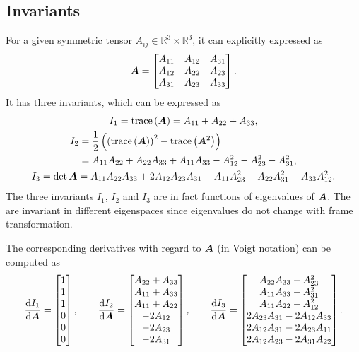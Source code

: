 \subsection{Invariants}
For a given symmetric tensor $A_{ij}\in\mathbb{R}^3\times\mathbb{R}^3$, it can explicitly expressed as
\begin{gather}
\bm{A}=
\begin{bmatrix}
A_{11}&A_{12}&A_{31}\\
A_{12}&A_{22}&A_{23}\\
A_{31}&A_{23}&A_{33}
\end{bmatrix}.
\end{gather}
It has three invariants, which can be expressed as
\begin{gather}\label{eq:tensor_invariant}
I_1=\text{trace}\left(\bm{A}\right)=A_{11}+A_{22}+A_{33},\\
\begin{split}
I_2&=\dfrac{1}{2}\left(\left(\text{trace}\left(\bm{A}\right)\right)^2-\text{trace}\left(\bm{A}^2\right)\right)\\
&=A_{11}A_{22}+A_{22}A_{33}+A_{11}A_{33}-A_{12}^2-A_{23}^2-A_{31}^2,
\end{split}\\
I_3=\det{\bm{A}}=A_{11}A_{22}A_{33}+2A_{12}A_{23}A_{31}-A_{11}A_{23}^2-A_{22}A_{31}^2-A_{33}A_{12}^2.
\end{gather}
The three invariants $I_1$, $I_2$ and $I_3$ are in fact functions of eigenvalues of $\bm{A}$.
The are invariant in different eigenspaces since eigenvalues do not change with frame transformation.

The corresponding derivatives with regard to $\bm{A}$ (in Voigt notation) can be computed as
\begin{gather}
	\dfrac{\mathrm{d}I_1}{\mathrm{d}\bm{A}}=\begin{bmatrix}
		1 \\
		1 \\
		1 \\
		0 \\
		0 \\
		0
	\end{bmatrix},\qquad
	\dfrac{\mathrm{d}I_2}{\mathrm{d}\bm{A}}=\begin{bmatrix}
		A_{22}+A_{33} \\
		A_{11}+A_{33} \\
		A_{11}+A_{22} \\
		-2A_{12}      \\
		-2A_{23}      \\
		-2A_{31}
	\end{bmatrix},\qquad
	\dfrac{\mathrm{d}I_3}{\mathrm{d}\bm{A}}=\begin{bmatrix}
		A_{22}A_{33}-A_{23}^2       \\
		A_{11}A_{33}-A_{31}^2       \\
		A_{11}A_{22}-A_{12}^2       \\
		2A_{23}A_{31}-2A_{12}A_{33} \\
		2A_{12}A_{31}-2A_{23}A_{11} \\
		2A_{12}A_{23}-2A_{31}A_{22}
	\end{bmatrix}.
\end{gather}

